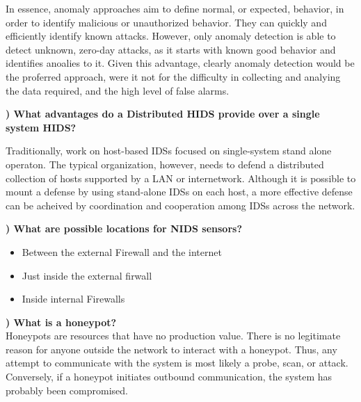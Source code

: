 \documentclass{report}
\newcommand{\mysubsection}[2]{\textbf{\romannumeral #1) #2}}
\begin{document}
In essence, anomaly approaches aim to define normal, or expected, behavior,
in order to identify malicious or unauthorized behavior. They can quickly and
efficiently identify known attacks. However, only anomaly detection is able to
detect unknown, zero-day attacks, as it starts with known good behavior and
identifies anoalies to it. Given this advantage, clearly anomaly detection
would be the proferred approach, were it not for the difficulty in collecting
and analying the data required, and the high level of false alarms.


\noindent\mysubsection{8}{What advantages do a Distributed HIDS provide over a single system HIDS?}


Traditionally, work on host-based IDSs focused on single-system stand alone
operaton. The typical organization, however, needs to defend a distributed
collection of hosts supported by a LAN or internetwork. Although it is possible
to mount a defense by using stand-alone IDSs on each host, a more effective
defense can be acheived by coordination and cooperation among IDSs across the
network.


\noindent\mysubsection{9}{What are possible locations for NIDS sensors?}
\begin{itemize}
  \item{Between the external Firewall and the internet} 
  \item{Just inside the external firwall} 
  \item{Inside internal Firewalls} 
\end{itemize}


\noindent\mysubsection{10}{What is a honeypot?}
\\Honeypots are resources that have no production value. There is no legitimate
reason for anyone outside the network to interact with a honeypot. Thus, any
attempt to communicate with the system is most likely a probe, scan, or attack.
Conversely, if a honeypot initiates outbound communication, the system has
probably been compromised.



\end{document}
